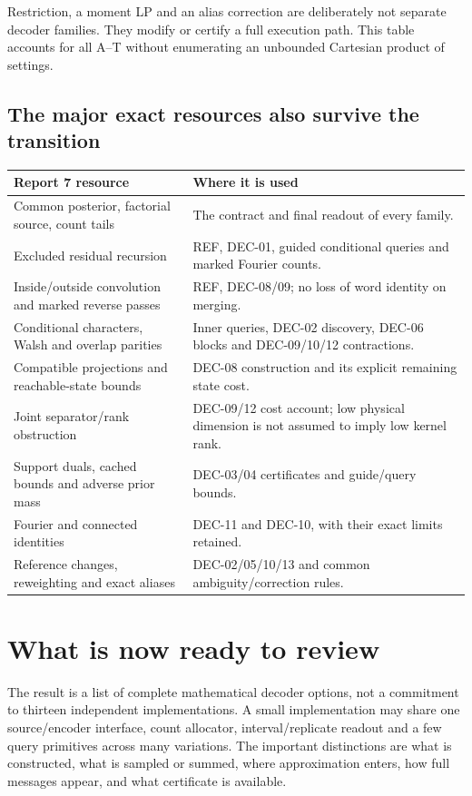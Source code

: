 \documentclass[10pt,a4paper]{article}
\begin{document}
Restriction, a moment LP and an alias correction are deliberately not separate decoder families.
They modify or certify a full execution path. This table accounts for all A--T without enumerating an
unbounded Cartesian product of settings.

\subsection{The major exact resources also survive the transition}
\begin{center}\small
\begin{tabularx}{\textwidth}{@{}>{\raggedright\arraybackslash}p{}Y@{}}\toprule
Report 7 resource & Where it is used\\\midrule
Common posterior, factorial source, count tails & The contract and final readout of every family.\\
Excluded residual recursion & REF, DEC-01, guided conditional queries and marked Fourier counts.\\
Inside/outside convolution and marked reverse passes & REF, DEC-08/09; no loss of word identity on merging.\\
Conditional characters, Walsh and overlap parities & Inner queries, DEC-02 discovery, DEC-06 blocks and DEC-09/10/12 contractions.\\
Compatible projections and reachable-state bounds & DEC-08 construction and its explicit remaining state cost.\\
Joint separator/rank obstruction & DEC-09/12 cost account; low physical dimension is not assumed to imply low kernel rank.\\
Support duals, cached bounds and adverse prior mass & DEC-03/04 certificates and guide/query bounds.\\
Fourier and connected identities & DEC-11 and DEC-10, with their exact limits retained.\\
Reference changes, reweighting and exact aliases & DEC-02/05/10/13 and common ambiguity/correction rules.\\\bottomrule
\end{tabularx}
\end{center}

\clearpage
\section{What is now ready to review}
\label{sec:review}
The result is a list of complete mathematical decoder options, not a commitment to thirteen independent
implementations. A small implementation may share one source/encoder interface, count allocator,
interval/replicate readout and a few query primitives across many variations.
The important distinctions are what is constructed, what is sampled or summed, where approximation
enters, how full messages appear, and what certificate is available.
\end{document}
